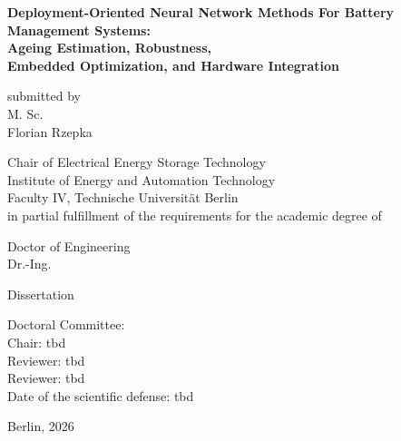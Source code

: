 \documentclass[
    a4paper,
    12pt,
    titlepage,
    bibliography=totoc,
    twoside=on,
    parskip=false,
    numbers=noenddot,
    cleardoublepage=empty,
    DIV=12,
    BCOR=12.0mm,
    headheight=36pt,
    headings=openright
]{scrreprt}
\begin{document}

\begin{titlepage}
\thispagestyle{empty}
\begin{singlespace}
\begin{center}
\vspace*{15pt}
\begin{onehalfspace}
\Huge{\textbf{Deployment-Oriented Neural Network Methods For Battery Management Systems:}}\\
\vspace*{10pt}
\Large{\textbf{Ageing Estimation, Robustness,}}\\
\Large{\textbf{Embedded Optimization, and Hardware Integration}}
\end{onehalfspace}
\vspace*{30pt}
\large{submitted by\\
M. Sc.\\
Florian Rzepka}\\
\vspace*{40pt}

\large{
Chair of Electrical Energy Storage Technology\\
Institute of Energy and Automation Technology\\
Faculty IV, Technische Universit\"at Berlin\\
in partial fulfillment of the requirements for the academic degree of\\}
\vspace{17pt}

\large{
Doctor of Engineering\\
Dr.-Ing.\\
}

\vspace{12pt}
\large{Dissertation\\}
\end{center}

\vspace{36pt}
\begin{flushleft}
\large{Doctoral Committee:\\}
\large{Chair: tbd\\
Reviewer: tbd\\
Reviewer: tbd\\
}
\vspace{10pt}
\large{Date of the scientific defense: tbd\\}
\end{flushleft}
\vspace{10pt}
\begin{center}
\large{Berlin, 2026}
\end{center}
\end{singlespace}
\end{titlepage}
\end{document}
